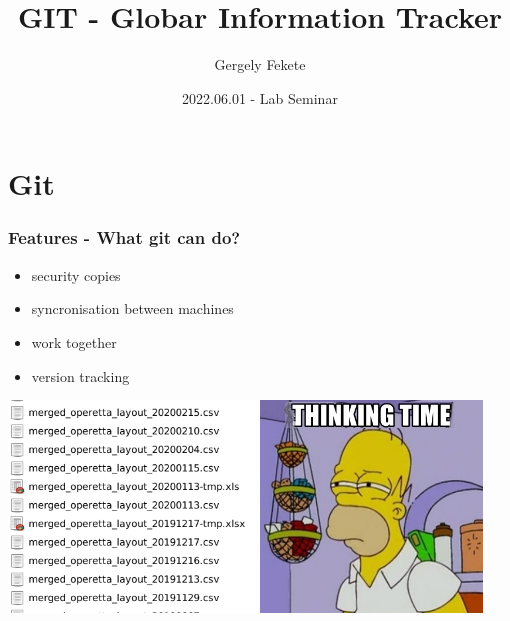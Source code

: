 \documentclass[aspectratio=169]{beamer}
\title{GIT - Globar Information Tracker}
\author{Gergely Fekete}
\date{2022.06.01 -  Lab Seminar}
\begin{document}
\begin{frame}
\titlepage
\end{frame}

\section{Git}



\begin{frame}
	\frametitle<presentation>{Features - What git can do?}
	
	\begin{itemize}
	\item security copies
	\item syncronisation between machines
	\item work together
	\item version tracking
	\end{itemize}

\end{frame}

 
\begin{frame}
\includegraphics[height=160pt]{pictures/Screenshot_2020-02-25_17-47-03-ugly_folder-zoom_in.png}
\includegraphics[height=160pt]{pictures/Simson.png}
\end{frame}


\end{document}
